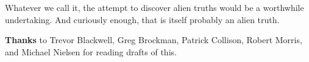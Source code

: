 Whatever we
                  call it, the attempt to discover alien truths would be a
                  worthwhile undertaking. And curiously enough, that is itself
                  probably an alien truth.





\textbf{Thanks} to Trevor Blackwell, Greg Brockman, Patrick
                    Collison, Robert Morris, and Michael Nielsen for reading
                    drafts of this.


              
            
          
            
              
                


                  
              
            
          
